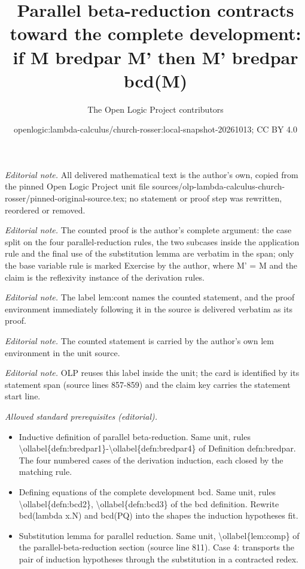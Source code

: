 \documentclass[10pt,a4paper]{article}
\title{Parallel beta-reduction contracts toward the complete development: if M bredpar M' then M' bredpar bcd(M)}
\author{The Open Logic Project contributors}
\date{openlogic:lambda-calculus/church-rosser:local-snapshot-20261013; CC BY 4.0}
\theoremstyle{plain}
\theoremstyle{definition}
\theoremstyle{remark}
\begin{document}
\maketitle
\noindent\textit{Editorial note.} All delivered mathematical text is the author's own, copied from the pinned Open Logic Project unit file sources/olp-lambda-calculus-church-rosser/pinned-original-source.tex; no statement or proof step was rewritten, reordered or removed.\par\medskip
\noindent\textit{Editorial note.} The counted proof is the author's complete argument: the case split on the four parallel-reduction rules, the two subcases inside the application rule and the final use of the substitution lemma are verbatim in the span; only the base variable rule is marked Exercise by the author, where M' = M and the claim is the reflexivity instance of the derivation rules.\par\medskip
\noindent\textit{Editorial note.} The label lem:cont names the counted statement, and the proof environment immediately following it in the source is delivered verbatim as its proof.\par\medskip
\noindent\textit{Editorial note.} The counted statement is carried by the author's own lem environment in the unit source.\par\medskip
\noindent\textit{Editorial note.} OLP reuses this label inside the unit; the card is identified by its statement span (source lines 857-859) and the claim key carries the statement start line.\par\medskip
\noindent\textit{Allowed standard prerequisites (editorial).}\begin{itemize}
\item Inductive definition of parallel beta-reduction. Same unit, rules \textbackslash{}ollabel\{defn:bredpar1\}-\textbackslash{}ollabel\{defn:bredpar4\} of Definition defn:bredpar. The four numbered cases of the derivation induction, each closed by the matching rule.
\item Defining equations of the complete development bcd. Same unit, rules \textbackslash{}ollabel\{defn:bcd2\}, \textbackslash{}ollabel\{defn:bcd3\} of the bcd definition. Rewrite bcd(lambda x.N) and bcd(PQ) into the shapes the induction hypotheses fit.
\item Substitution lemma for parallel reduction. Same unit, \textbackslash{}ollabel\{lem:comp\} of the parallel-beta-reduction section (source line 811). Case 4: transports the pair of induction hypotheses through the substitution in a contracted redex.
\end{itemize}\medskip
\end{document}
